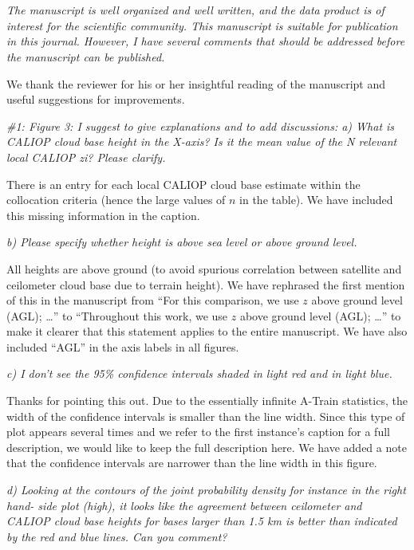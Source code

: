 \documentclass[12pt,a4paper]{responses}
\begin{document}
\section{}

\textit{The manuscript is well organized and well written, and the data product
  is of interest for the scientific community.  This manuscript is suitable for
  publication in this journal.  However, I have several comments that should be
  addressed before the manuscript can be published.}

We thank the reviewer for his or her insightful reading of the manuscript and
useful suggestions for improvements.

\textit{\#1: Figure 3: I suggest to give explanations and to add discussions: a)
  What is CALIOP cloud base height in the X-axis?  Is it the mean value of the N
  relevant local CALIOP zi? Please clarify.}

There is an entry for each local CALIOP cloud base estimate within the
collocation criteria (hence the large values of $n$ in the table).  We have
included this missing information in the caption.

\textit{b) Please specify whether height is above sea level or above ground
  level.}

All heights are above ground (to avoid spurious correlation between satellite
and ceilometer cloud base due to terrain height).  We have rephrased the first
mention of this in the manuscript from ``For this comparison, we use $z$ above
ground level (AGL); \dots'' to ``Throughout this work, we use $z$ above ground
level (AGL); \dots'' to make it clearer that this statement applies to the
entire manuscript.  We have also included ``AGL'' in the axis labels in all
figures.

\textit{c) I don’t see the 95\% confidence intervals shaded in light red and in
  light blue.}

Thanks for pointing this out.  Due to the essentially infinite A-Train
statistics, the width of the confidence intervals is smaller than the line
width.  Since this type of plot appears several times and we refer to the first
instance's caption for a full description, we would like to keep the full
description here.  We have added a note that the confidence intervals are
narrower than the line width in this figure.

\textit{d) Looking at the contours of the joint probability density for instance
  in the right hand- side plot (high), it looks like the agreement between
  ceilometer and CALIOP cloud base heights for bases larger than 1.5 km is
  better than indicated by the red and blue lines.  Can you comment?  }
\end{document}
